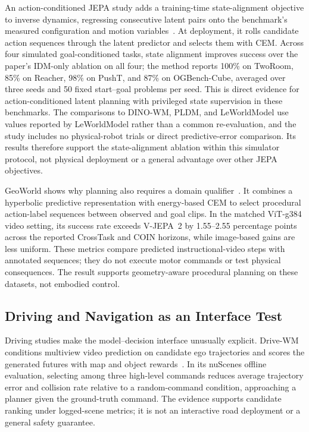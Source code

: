 An action-conditioned JEPA study adds a training-time state-alignment objective to inverse dynamics, regressing consecutive latent pairs onto the benchmark's measured configuration and motion variables~\cite{liu2026physicallygroundedjepa}. At deployment, it rolls candidate action sequences through the latent predictor and selects them with CEM. Across four simulated goal-conditioned tasks, state alignment improves success over the paper's IDM-only ablation on all four; the method reports 100\% on TwoRoom, 85\% on Reacher, 98\% on PushT, and 87\% on OGBench-Cube, averaged over three seeds and 50 fixed start--goal problems per seed. This is direct evidence for action-conditioned latent planning with privileged state supervision in these benchmarks. The comparisons to DINO-WM, PLDM, and LeWorldModel use values reported by LeWorldModel rather than a common re-evaluation, and the study includes no physical-robot trials or direct predictive-error comparison. Its results therefore support the state-alignment ablation within this simulator protocol, not physical deployment or a general advantage over other JEPA objectives.

GeoWorld shows why planning also requires a domain qualifier~\cite{zhang2026geoworld}. It combines a hyperbolic predictive representation with energy-based CEM to select procedural action-label sequences between observed and goal clips. In the matched ViT-g384 video setting, its success rate exceeds V-JEPA~2 by 1.55--2.55 percentage points across the reported CrossTask and COIN horizons, while image-based gains are less uniform. These metrics compare predicted instructional-video steps with annotated sequences; they do not execute motor commands or test physical consequences. The result supports geometry-aware procedural planning on these datasets, not embodied control.

\subsection{Driving and Navigation as an Interface Test}
Driving studies make the model--decision interface unusually explicit. Drive-WM conditions multiview video prediction on candidate ego trajectories and scores the generated futures with map and object rewards~\cite{wang2024drivewm}. In its nuScenes offline evaluation, selecting among three high-level commands reduces average trajectory error and collision rate relative to a random-command condition, approaching a planner given the ground-truth command. The evidence supports candidate ranking under logged-scene metrics; it is not an interactive road deployment or a general safety guarantee.

